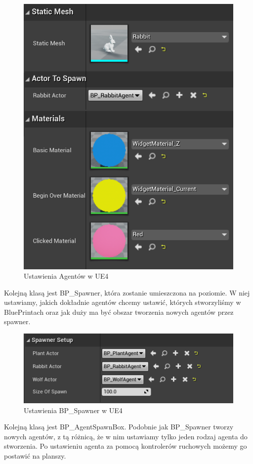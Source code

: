 \documentclass[a4paper,12pt,reqno]{article}
\begin{document}
\begin{figure}[H]%
\centering
\includegraphics[width=0.5\columnwidth]{graphics//agent/BP_AgentActor.png}
\caption{Ustawienia Agentów w UE4 
\label{BPExample}}%
%
\qquad
\end{figure} 


Kolejną klasą jest BP\_Spawner, która zostanie umieszczona na poziomie. W niej ustawiamy, jakich dokładnie agentów chcemy ustawić, których stworzyliśmy w BluePrintach oraz jak duży ma być obszar tworzenia nowych agentów przez spawner.

\begin{figure}[H]%
\centering
\includegraphics[width=0.6\columnwidth]{graphics//agent/BP_SpawnerAgent.png}
\caption{Ustawienia BP\_Spawner w UE4 
\label{BPExample}}%
%
\qquad
\end{figure} 

Kolejną klasą jest BP\_AgentSpawnBox. Podobnie jak BP\_Spawner tworzy nowych agentów, z tą różnicą, że w nim ustawiamy tylko jeden rodzaj agenta do stworzenia. Po ustawieniu agenta za pomocą kontrolerów ruchowych możemy go postawić na planszy.
\end{document}
